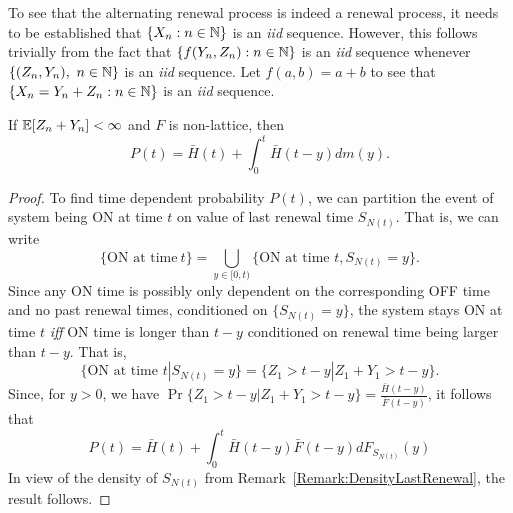 \documentclass[a4paper,10pt,english]{article}
\begin{document}
To see that the alternating renewal process is indeed a renewal process, it needs to be established that $\{X_n:n\in\mathbb{N}\}$ is an \textit{iid} sequence. 
However, this follows trivially from the fact that $\{f(Y_n,Z_n):n\in\mathbb{N}\}$ is an \textit{iid} sequence whenever $\{(Z_n,Y_n),~n \in \mathbb{N}\}$ is an \textit{iid} sequence. Let $f(a,b) = a+b$ to see that $\{X_n = Y_n + Z_n: n\in\mathbb{N}\}$ is an \textit{iid} sequence.

\begin{thm}[ON Probability] \label{Thm:OnProbability}
If $\mathbb{E}[Z_n+Y_n]< \infty $ and $F$ is non-lattice, then
\begin{equation*}
P(t) = \bar{H}(t)+\int_{0}^{t}\bar{H}(t-y)dm(y).
\end{equation*}
\end{thm} 
\begin{proof} To find time dependent probability $P(t)$, we can partition the event of system being ON at time $t$ on value of last renewal time $S_{N(t)}$. That is, we can write
\begin{equation*}
\{\text{ON at time}~ t\} =\bigcup_{y \in [0, t)}\{\text{ON at time } t, S_{N(t)} = y\}.%
\end{equation*}
Since any ON time is possibly only dependent on the corresponding OFF time and no past renewal times, conditioned on $\{S_{N(t)} = y \}$, the system stays ON at time $t$ \textit{iff} ON time is longer than $t-y$ conditioned on renewal time being larger than $t-y$. That is, 
\begin{equation*}
\{\text{ON at time } t| S_{N(t)} = y\} =\{Z_1 > t - y| Z_1 + Y_1 > t-y\}.
\end{equation*}
Since, for $y>0$, we have $\Pr\{Z_1 > t - y| Z_1 + Y_1 > t-y\} = \frac{\bar{H}(t-y)}{\bar{F}(t-y)}$, it follows that
\begin{equation*}
P(t) = \bar{H}(t)+ \int_{0}^t {\bar{H}(t-y)}{\bar{F}(t-y)}dF_{S_{N(t)}}(y)
\end{equation*}
In view of the density of $S_{N(t)}$ from Remark~\ref{Remark:DensityLastRenewal}, the result follows.
\end{proof}
\end{document}

